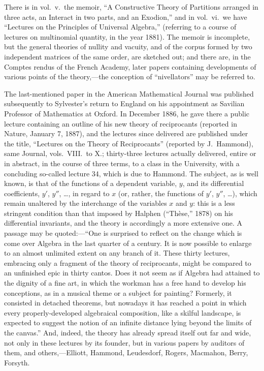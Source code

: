 \documentclass[11pt,a4paper]{article}
\begin{document}
There is in vol.\ v.\ the memoir, ``A Constructive Theory of Partitions arranged in three acts, an Interact in two parts, and an Exodion,'' and in vol.\ vi.\ we have ``Lectures on the Principles of Universal Algebra,'' (referring to a course of lectures on multinomial quantity, in the year 1881). The memoir is incomplete, but the general theories of nullity and vacuity, and of the corpus formed by two independent matrices of the same order, are sketched out; and there are, in the Comptes rendus of the French Academy, later papers containing developments of various points of the theory,---the conception of ``nivellators'' may be referred to.

The last-mentioned paper in the American Mathematical Journal was published subsequently to Sylvester's return to England on his appointment as Savilian Professor of Mathematics at Oxford. In December 1886, he gave there a public lecture containing an outline of his new theory of reciprocants (reported in Nature, January 7, 1887), and the lectures since delivered are published under the title, ``Lectures on the Theory of Reciprocants'' (reported by J.\ Hammond), same Journal, vols.\ VIII.\ to X.; thirty-three lectures actually delivered, entire or in abstract, in the course of three terms, to a class in the University, with a concluding so-called lecture 34, which is due to Hammond. The subject, as is well known, is that of the functions of a dependent variable, $y$, and its differential coefficients, $y'$, $y''$, \ldots, in regard to $x$ (or, rather, the functions of $y'$, $y''$, \ldots), which remain unaltered by the interchange of the variables $x$ and $y$: this is a less stringent condition than that imposed by Halphen (``Th\`ese,'' 1878) on his differential invariants, and the theory is accordingly a more extensive one. A passage may be quoted:---``One is surprised to reflect on the change which is come over Algebra in the last quarter of a century. It is now possible to enlarge to an almost unlimited extent on any branch of it. These thirty lectures, embracing only a fragment of the theory of reciprocants, might be compared to an unfinished epic in thirty cantos. Does it not seem as if Algebra had attained to the dignity of a fine art, in which the workman has a free hand to develop his conceptions, as in a musical theme or a subject for painting? Formerly, it consisted in detached theorems, but nowadays it has reached a point in which every properly-developed algebraical composition, like a skilful landscape, is expected to suggest the notion of an infinite distance lying beyond the limits of the canvas.'' And, indeed, the theory has already spread itself out far and wide, not only in these lectures by its founder, but in various papers by auditors of them, and others,---Elliott, Hammond, Leudesdorf, Rogers, Macmahon, Berry, Forsyth.
\end{document}
